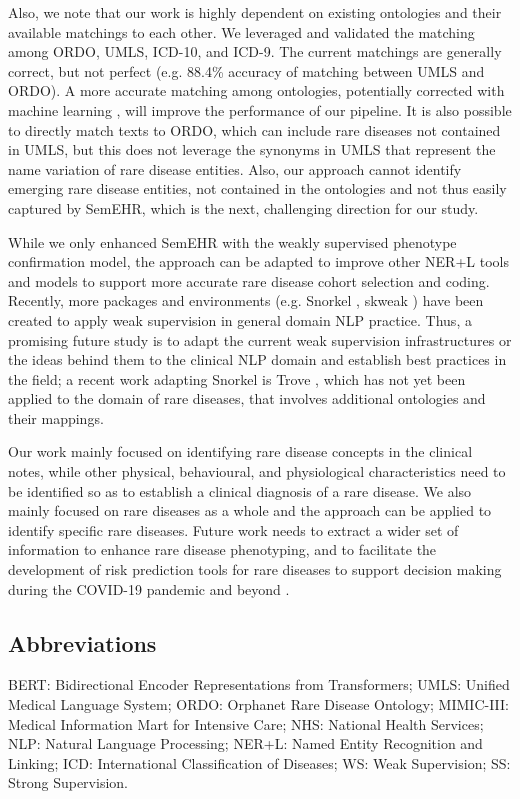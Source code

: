 \documentclass[twocolumn]{bmcart}
\begin{document}
Also, we note that our work is highly dependent on existing ontologies and their available matchings to each other. We leveraged and validated the matching among ORDO, UMLS, ICD-10, and ICD-9. The current matchings are generally correct, but not perfect (e.g. 88.4\% accuracy of matching between UMLS and ORDO). A more accurate matching among ontologies, potentially corrected with machine learning \cite{kolyvakis2018}, will improve the performance of our pipeline. It is also possible to directly match texts to ORDO, which can include rare diseases not contained in UMLS, but this does not leverage the synonyms in UMLS that represent the name variation of rare disease entities. Also, our approach cannot identify emerging rare disease entities, not contained in the ontologies and not thus easily captured by SemEHR, which is the next, challenging direction for our study.

While we only enhanced SemEHR with the weakly supervised phenotype confirmation model, the approach can be adapted to improve other NER+L tools and models to support more accurate rare disease cohort selection and coding. Recently, more packages and environments (e.g. Snorkel \cite{ratner2020snorkel}, skweak \cite{lison2021}) have been created to apply weak supervision in general domain NLP practice. Thus, a promising future study is to adapt the current weak supervision infrastructures or the ideas behind them to the clinical NLP domain and establish best practices in the field; a recent work adapting Snorkel \cite{ratner2020snorkel} is Trove \cite{fries2021ontology}, which has not yet been applied to the domain of rare diseases, that involves additional ontologies and their mappings.

Our work mainly focused on identifying rare disease concepts in the clinical notes, while other physical, behavioural, and physiological characteristics need to be identified so as to establish a clinical diagnosis of a rare disease. We also mainly focused on rare diseases as a whole and the approach can be applied to identify specific rare diseases. Future work needs to extract a wider set of information to enhance rare disease phenotyping, and to facilitate the development of risk prediction tools for rare diseases to support decision making during the COVID-19 pandemic and beyond \cite{zhang2021,zhang2022}.

\begin{backmatter}
\section*{Abbreviations}BERT: Bidirectional Encoder Representations from Transformers; UMLS: Unified Medical Language System; ORDO: Orphanet Rare Disease Ontology; MIMIC-III: Medical Information Mart for Intensive Care; NHS: National Health Services; NLP: Natural Language Processing; NER+L: Named Entity Recognition and Linking; ICD: International Classification of Diseases; WS: Weak Supervision; SS: Strong Supervision.
\end{backmatter}
\end{document}
